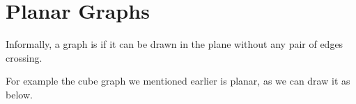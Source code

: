 \documentclass[a4paper]{scrreprt}
\begin{document}
\chapter{Planar Graphs}

Informally, a graph is  if
it can be drawn in the plane without any pair of edges crossing.

For example the cube graph we mentioned earlier is planar, as we can draw it as below.

\begin{center}
	


\begin{tikzpicture}[x=0.75pt,y=0.75pt,yscale=-1,xscale=1]


\end{tikzpicture}
\end{center}
\end{document}
